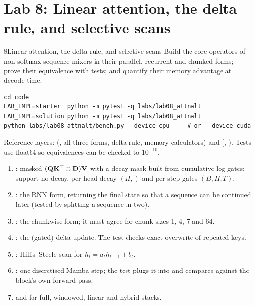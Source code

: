 \section{Lab 8: Linear attention, the delta rule, and selective scans}\label{sec:attnalt:lab}
\begin{labbox}{8}{Linear attention, the delta rule, and selective scans}
Build the core operators of non-softmax sequence mixers in their parallel, recurrent and chunked forms;
prove their equivalence with tests; and quantify their memory advantage at decode time.

\begin{lstlisting}[style=shell]
cd code
LAB_IMPL=starter  python -m pytest -q labs/lab08_attnalt
LAB_IMPL=solution python -m pytest -q labs/lab08_attnalt
python labs/lab08_attnalt/bench.py --device cpu     # or --device cuda
\end{lstlisting}
Reference layers:  (, all three forms, delta rule,
memory calculators) and  (, ). Tests use float64
so equivalences can be checked to $10^{-10}$.

\begin{enumerate}
\item {}: masked $(\mathbf{Q}\mathbf{K}^\top\odot\mathbf{D})\mathbf{V}$ with a decay
  mask built from cumulative log-gates; support no decay, per-head decay $(H,)$ and per-step gates $(B,H,T)$.
\item {}: the RNN form, returning the final state so that a sequence can be
  continued later (tested by splitting a sequence in two).
\item {}: the chunkwise form; it must agree for chunk sizes 1, 4, 7 and 64.
\item {}: the (gated) delta update. The test checks exact overwrite of repeated keys.
\item {}: Hillis--Steele scan for $h_t=a_th_{t-1}+b_t$.
\item {}: one discretised Mamba step; the test plugs it into  and
  compares against the block's own forward pass.
\item {} and  for full, windowed, linear and hybrid stacks.
\end{enumerate}


\end{labbox}
